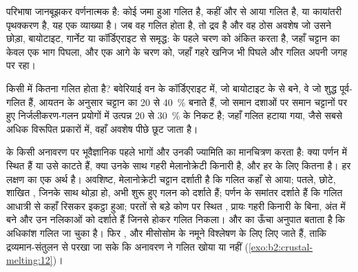 परिभाषा जानबूझकर वर्णनात्मक है: कोई  जमा हुआ गलित है, कहीं और से आया
गलित है, या कायांतरी पृथक्करण है, यह एक व्याख्या है। जब वह
गलित होता है, तो  द्रव है और  वह ठोस अवशेष जो उसने छोड़ा, बायोटाइट,
गार्नेट या कॉर्डिएराइट से समृद्ध:   के पहले चरण को अंकित करता है, जहाँ
चट्टान का केवल एक भाग पिघला, और  एक आगे के चरण को, जहाँ गहरे खनिज
भी पिघले और गलित अपनी जगह पर रहा।

किसी  में कितना गलित होता है? बवेरियाई वन के कॉर्डिएराइट  में,
जो बायोटाइट के  से बने, वे  जो शुद्ध पूर्व-गलित हैं, आयतन के अनुसार चट्टान का 20 से
\qty{40}{\percent} बनाते हैं, जो समान दशाओं पर समान चट्टानों पर हुए निर्जलीकरण-गलन प्रयोगों में उत्पन्न
20 से \qty{30}{\percent} के निकट है; जहाँ गलित
हटाया गया, जैसे सबसे अधिक विरूपित प्रकारों में, वहाँ अवशेष पीछे छूट जाता है।

\begin{inthefield}[मिग्मेटाइट के अनावरण को पढ़ना]
 के किसी अनावरण पर भूवैज्ञानिक पहले भागों और उनकी ज्यामिति का मानचित्रण करता है: क्या
 पर्णन में स्थित हैं या उसे काटते हैं, क्या उनके साथ गहरी मेलानोक्रेटी किनारी है,
और हर  के लिए कितना  है। हर लक्षण का एक अर्थ है। अवशिष्ट,
मेलानोक्रेटी चट्टान दर्शाती है कि गलित कहाँ से आया; पतले, छोटे, शाखित , जिनके साथ
थोड़ा  हो, अभी शुरू हुए गलन को दर्शाते हैं; पर्णन के समांतर 
दर्शाते हैं कि गलित आधात्री से कहाँ रिसकर इकट्ठा हुआ; परतों से बड़े कोण पर स्थित ,
प्रायः गहरी किनारी के बिना, अंत में बने और उन नलिकाओं को दर्शाते हैं जिनसे होकर
गलित निकला।  और  का ऊँचा अनुपात बताता है कि अधिकांश गलित जा चुका है।
फिर ,  और मीसोसोम के नमूने विश्लेषण के लिए लिए जाते हैं, ताकि द्रव्यमान-संतुलन
से परखा जा सके कि अनावरण ने गलित खोया या नहीं (\cref{exo:b2:crustal-melting:12})।
\end{inthefield}

